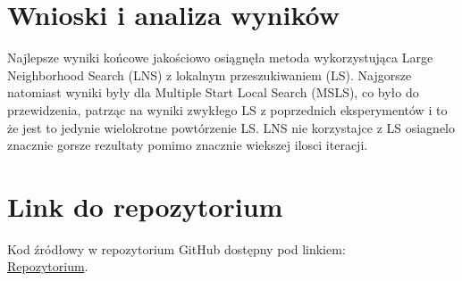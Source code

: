 \documentclass[11pt]{article}
\begin{document}
\section{Wnioski i analiza wyników}\label{sec:wnioski}

Najlepsze wyniki końcowe jakościowo osiągnęła metoda wykorzystująca Large Neighborhood Search (LNS) z lokalnym przeszukiwaniem (LS).
Najgorsze natomiast wyniki były dla Multiple Start Local Search (MSLS), co było do przewidzenia, patrząc na wyniki zwykłego LS z poprzednich eksperymentów i to że jest to jedynie wielokrotne powtórzenie LS.
LNS nie korzystajce z LS osiagnelo znacznie gorsze rezultaty pomimo znacznie wiekszej ilosci iteracji.

\section{Link do repozytorium}\label{sec:link-do-repo}
Kod źródłowy w repozytorium GitHub dostępny pod linkiem: \\
\href{https://github.com/KotZPolibudy/PUT_IMO/tree/main/Lab4%20-%20Ext_Local_search}{Repozytorium}.
\end{document}

